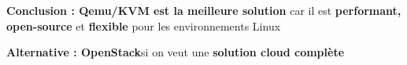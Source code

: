 \documentclass[../Livrable1.tex]{subfiles}
\begin{document}
\vspace{0.5cm}

\textbf{Conclusion : Qemu/KVM est la meilleure solution} car il est \textbf{performant, open-source} et \textbf{flexible} pour les environnements Linux

\vspace{0.5cm}

\textbf{Alternative : OpenStack}si on veut une \textbf{solution cloud complète}
\end{document}

